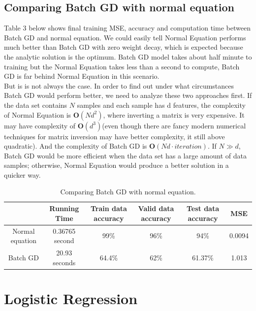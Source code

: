 \documentclass[10pt,letterpaper]{article}
\begin{document}
\subsection{Comparing Batch GD with normal equation}

 \qquad Table 3 below shows final training MSE, accuracy and computation time between Batch GD and normal equation. We could easily tell Normal Equation performs much better than Batch GD with zero weight decay, which is expected because the analytic solution is the optimum. Batch GD model takes about half minute to training but the Normal Equation takes less than a second to compute, Batch GD is far behind Normal Equation in this scenario.\\

But is is not always the case. 
In order to find out under what circumstances Batch GD would perform better, we need to analyze these two approaches first. If the data set contains $N$ samples and each sample has d features, the complexity of Normal Equation is $\textbf{O}(Nd^{2})$, where inverting a matrix is very expensive. It may have complexity of $\textbf{O}(d^{3})$(even though there are fancy modern numerical techniques for matrix inversion may have better complexity, it still above quadratic). And the complexity of Batch GD is $\textbf{O}(Nd \cdot iteration)$. If $N \gg d$, Batch GD would be more efficient when the data set has a large amount of data samples; otherwise,  Normal Equation would produce a better solution in a quicker way.

\begin{table}[h]
\centering
\begin{tabular}{|c|c|c|c|c|c|}
\hline
   & Running Time      &  Train data accuracy      &  Valid data accuracy &  Test data accuracy & MSE     \\ \hline
Normal equation & 0.36765 second & 99\%  & 96\% & 94\%  & 0.0094 \\ \hline
Batch GD    & 20.93 seconds  & 64.4\% & 62\%   & 61.37\%  & 1.013  \\ \hline

\end{tabular}
\caption{Comparing Batch GD with normal equation.}
\end{table}




\section{Logistic Regression}
\end{document}
